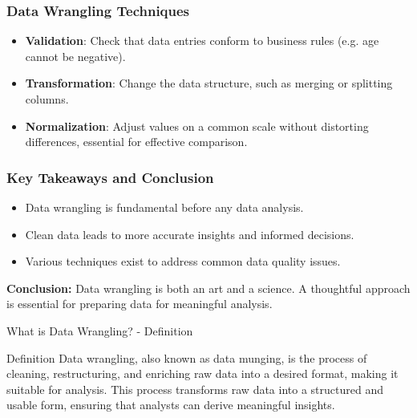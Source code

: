 \documentclass[aspectratio=169]{beamer}
\begin{document}
\begin{frame}[fragile]
    \frametitle{Data Wrangling Techniques}
    \begin{itemize}
        \item \textbf{Validation}:
            Check that data entries conform to business rules (e.g. age cannot be negative).

        \item \textbf{Transformation}:
            Change the data structure, such as merging or splitting columns.

        \item \textbf{Normalization}:
            Adjust values on a common scale without distorting differences, essential for effective comparison.
    \end{itemize}
\end{frame}

\begin{frame}[fragile]
    \frametitle{Key Takeaways and Conclusion}
    \begin{itemize}
        \item Data wrangling is fundamental before any data analysis.
        \item Clean data leads to more accurate insights and informed decisions.
        \item Various techniques exist to address common data quality issues.
    \end{itemize}
    \vspace{0.5cm}
    \textbf{Conclusion:} Data wrangling is both an art and a science. A thoughtful approach is essential for preparing data for meaningful analysis.
\end{frame}

\begin{frame}[fragile]{What is Data Wrangling? - Definition}
    \begin{block}{Definition}
        Data wrangling, also known as data munging, is the process of cleaning, restructuring, and enriching raw data into a desired format, making it suitable for analysis. This process transforms raw data into a structured and usable form, ensuring that analysts can derive meaningful insights.
    \end{block}
\end{frame}
\end{document}
